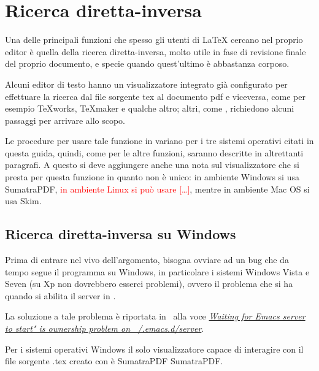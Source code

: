 \documentclass[11pt,a4paper]{article}
\begin{document}
\section{Ricerca diretta-inversa}
\label{sec:ricdirinv}

Una delle principali funzioni che spesso gli utenti di \LaTeX{} cercano nel
proprio editor è quella della ricerca diretta-inversa, molto utile in fase di
revisione finale del proprio documento, e specie quando quest'ultimo è
abbastanza corposo.

Alcuni editor di testo hanno un visualizzatore integrato già configurato per
effettuare la ricerca dal file sorgente tex al documento pdf e viceversa, come
per esempio \TeX works, \TeX maker e qualche altro; altri, come \emacs,
richiedono alcuni passaggi per arrivare allo scopo.

Le procedure per usare tale funzione in \emacs{} variano per i tre sistemi
operativi citati in questa guida, quindi, come per le altre funzioni, saranno
descritte in altrettanti paragrafi. A questo si deve aggiungere anche una nota
sul visualizzatore che si presta per questa funzione in quanto non è unico: in
ambiente Windows si usa SumatraPDF, \textcolor{red}{in ambiente Linux si
  può usare [\ldots]}, mentre in ambiente Mac OS si usa Skim.

\subsection{Ricerca diretta-inversa su Windows}
\label{sec:fiswin}
Prima di entrare nel vivo dell'argomento, bisogna ovviare ad un bug che da tempo
segue il programma \emacs{} su Windows, in particolare i sistemi Windows Vista e
Seven (su Xp non dovrebbero esserci problemi), ovvero il problema che si ha
quando si abilita il server in \emacs. 


La soluzione a tale problema è riportata in~\cite{emacsW32:wiki}
alla voce
\href{http://www.emacswiki.org/emacs/EmacsW32#toc49}{\emph{Waiting for
    Emacs server to start" is ownership problem on
    ~/.emacs.d/server}}.

Per i sistemi operativi Windows il solo visualizzatore capace di
interagire con il file sorgente \textsf{.tex} creato con \emacs{} è
SumatraPDF %
%
{SumatraPDF}.
\end{document}
